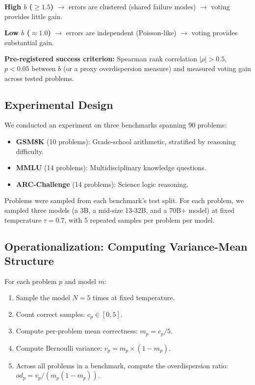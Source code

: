\documentclass[11pt,letterpaper]{article}
\begin{document}
\textbf{High $b$ ($\geq 1.5$)} $\rightarrow$ errors are clustered (shared failure modes) $\rightarrow$ voting provides little gain.

\textbf{Low $b$ ($\approx 1.0$)} $\rightarrow$ errors are independent (Poisson-like) $\rightarrow$ voting provides substantial gain.

\textbf{Pre-registered success criterion:} Spearman rank correlation $|\rho| > 0.5$, $p < 0.05$ between $b$ (or a proxy overdispersion measure) and measured voting gain across tested problems.

\subsection{Experimental Design}

We conducted an experiment on three benchmarks spanning 90 problems:

\begin{itemize}
  \item \textbf{GSM8K} (10 problems): Grade-school arithmetic, stratified by reasoning difficulty.
  \item \textbf{MMLU} (14 problems): Multidisciplinary knowledge questions.
  \item \textbf{ARC-Challenge} (14 problems): Science logic reasoning.
\end{itemize}

Problems were sampled from each benchmark's test split. For each problem, we sampled three models (a 3B, a mid-size 13-32B, and a 70B+ model) at fixed temperature $\tau = 0.7$, with 5 repeated samples per problem per model.

\subsection{Operationalization: Computing Variance-Mean Structure}

For each problem $p$ and model $m$:

\begin{enumerate}
  \item Sample the model $N = 5$ times at fixed temperature.
  \item Count correct samples: $c_p \in [0, 5]$.
  \item Compute per-problem mean correctness: $m_p = c_p / 5$.
  \item Compute Bernoulli variance: $v_p = m_p \times (1 - m_p)$.
  \item Across all problems in a benchmark, compute the overdispersion ratio: $od_p = v_p / (m_p(1 - m_p))$.
\end{enumerate}
\end{document}
